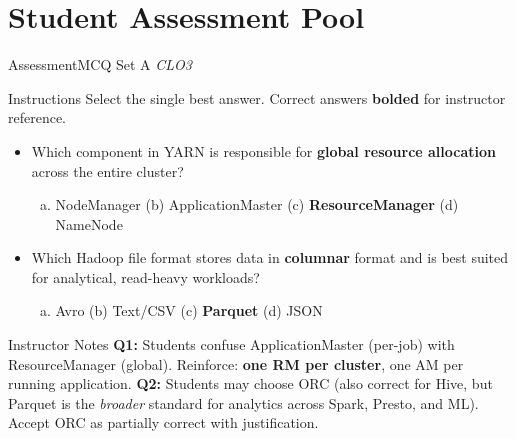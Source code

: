 \documentclass[aspectratio=169,10pt]{beamer}
\begin{document}
\section{Student Assessment Pool}

\begin{frame}{Assessment\textemdash MCQ Set A \hfill\small\textit{CLO3}}
  \begin{exampleblock}{Instructions}
    Select the single best answer.  Correct answers \textbf{bolded} for instructor reference.
  \end{exampleblock}
  \vspace{8pt}
  \begin{itemize}
    \item[\textbf{Q1.}] Which component in YARN is responsible for \textbf{global resource allocation} across the entire cluster?
    \begin{enumerate}[(a)]
      \item NodeManager \quad (b) ApplicationMaster \quad (c) \textbf{ResourceManager} \quad (d) NameNode
    \end{enumerate}
  \end{itemize}
  \vspace{8pt}
  \begin{itemize}
    \item[\textbf{Q2.}] Which Hadoop file format stores data in \textbf{columnar} format and is best suited for analytical, read-heavy workloads?
    \begin{enumerate}[(a)]
      \item Avro \quad (b) Text/CSV \quad (c) \textbf{Parquet} \quad (d) JSON
    \end{enumerate}
  \end{itemize}
  \vspace{8pt}
  \begin{alertblock}{Instructor Notes}
    \textbf{Q1:} Students confuse ApplicationMaster (per-job) with ResourceManager (global).  Reinforce: \textbf{one RM per cluster}, one AM per running application.  \textbf{Q2:} Students may choose ORC (also correct for Hive, but Parquet is the \emph{broader} standard for analytics across Spark, Presto, and ML).  Accept ORC as partially correct with justification.
  \end{alertblock}
\end{frame}
\end{document}
